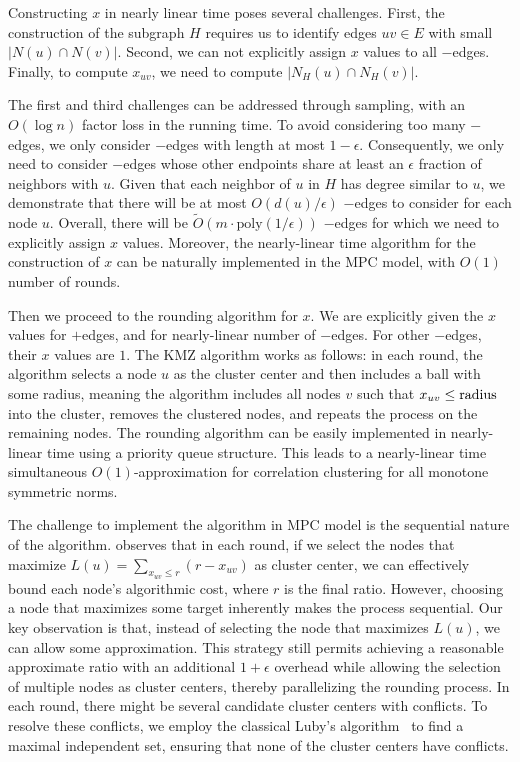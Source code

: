 \documentclass[11pt]{article}
\newcommand{\poly}{{\mathrm{poly}}}
\begin{document}
\begin{CJK*}{UTF8}{gbsn}
Constructing $x$ in nearly linear time poses several challenges. First, the construction of the subgraph $H$ requires us to identify edges $uv \in E$ with small $|N(u) \cap N(v)|$. Second, we can not explicitly assign $x$ values to all $-$edges. Finally, to compute $x_{uv}$, we need to compute $|N_H(u) \cap N_H(v)|$. 

The first and third challenges can be addressed through sampling, with an $O(\log n)$ factor loss in the running time. To avoid considering too many $-$edges, we only consider $-$edges with length at most $1-\epsilon$. Consequently, we only need to consider $-$edges whose other endpoints share at least an $\epsilon$ fraction of neighbors with $u$. Given that each neighbor of $u$ in $H$ has degree similar to $u$, we demonstrate that there will be at most $O(d(u) / \epsilon)$ $-$edges to consider for each node $u$. Overall, there will be $\tilde O(m \cdot \poly(1/\epsilon))$ $-$edges for which we need to explicitly assign $x$ values.  Moreover, the nearly-linear time algorithm for the construction of $x$ can be naturally implemented in the MPC model, with $O(1)$ number of rounds.  \smallskip

Then we proceed to the rounding algorithm for $x$. We are explicitly given the $x$ values for $+$edges, and for nearly-linear number of $-$edges. For other $-$edges, their $x$ values are $1$. 
The KMZ algorithm works as follows: in each round, the algorithm selects a node $u$ as the cluster center and then includes a ball with some radius, meaning the algorithm includes all nodes $v$ such that $x_{uv} \leq \textmd{radius}$ into the cluster, removes the clustered nodes, and repeats the process on the remaining nodes. The rounding algorithm can be easily implemented in nearly-linear time using a priority queue structure.  This leads to a nearly-linear time simultaneous $O(1)$-approximation for correlation clustering for all monotone symmetric norms. 

The challenge to implement the algorithm in MPC model is the sequential nature of the algorithm. \cite{kalhan2019correlation} observes that in each round, if we select the nodes that maximize $L(u) = \sum_{x_{uv} \leq r}(r - x_{uv})$ as cluster center, we can effectively bound each node's algorithmic cost, where $r$ is the final ratio. However, choosing a node that maximizes some target inherently makes the process sequential. Our key observation is that, instead of selecting the node that maximizes $L(u)$, we can allow some approximation. This strategy still permits achieving a reasonable approximate ratio with an additional $1 + \epsilon$ overhead while allowing the selection of multiple nodes as cluster centers, thereby parallelizing the rounding process. In each round, there might be several candidate cluster centers with conflicts. To resolve these conflicts, we employ the classical Luby's algorithm~\cite{luby1985simple, chierichetti2014correlation} to find a maximal independent set, ensuring that none of the cluster centers have conflicts.












\end{CJK*}
\end{document}
